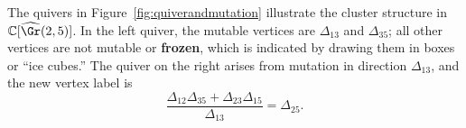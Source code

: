 \begin{exam}\label{example:initialseed}
The quivers in Figure~\ref{fig:quiverandmutation} illustrate the cluster structure in $\mathbb{C}[\widehat{\Gr}(2,5)]$. In the left quiver, the mutable vertices are $\Delta_{13}$ and $\Delta_{35}$; all other vertices are not mutable or \textbf{frozen}, which is indicated by drawing them in boxes or ``ice cubes.''  The quiver on the right arises from mutation in direction $\Delta_{13}$, and the new vertex label is
\[\frac{\Delta_{12}\Delta_{35}+\Delta_{23}\Delta_{15}}{\Delta_{13}}=\Delta_{25}.\]

\begin{figure}
\centering
{}

\begin{tikzpicture}[x=0.75pt,y=0.75pt,yscale=-.9,xscale=.9]


\end{tikzpicture}
\end{figure}
\end{exam}
